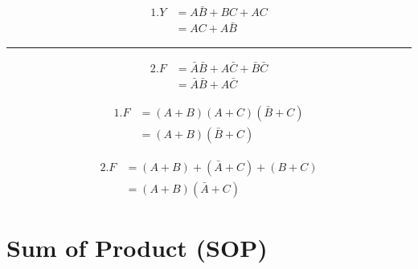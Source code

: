 \documentclass[a4aper,12pt]{report}
\newcounter{examplebox}[chapter]
\begin{document}
\begin{examplebox}[Simplify \\
    \ensuremath{1.Y=A\overline{B}+BC+AC\\2.F=\bar{A}\bar{B}+A\bar{C}+\bar{B}\bar{C}}]
    \begin{minipage}{.45\linewidth}
         \begin{align*}
        1.Y&=A\bar{B}+BC+AC\\
           &=AC+A\bar{B}
    \end{align*}
    \end{minipage}
    \begin{minipage}{0.09\linewidth}
        \rule{1.2pt}{1.7cm}
    \end{minipage}
   \begin{minipage}{.45\linewidth}
        \begin{align*}
            2.F&=\bar{A}\bar{B}+A\bar{C}+\bar{B}\bar{C}\\
               &=\bar{A}\bar{B}+A\bar{C}
        \end{align*}
   \end{minipage}

\end{examplebox}
\vspace{10pt}
\begin{examplebox}[Simplify\\ \ensuremath{1.F=(A+B)(A+C)(\bar{B}+C)\\2.F=(A+B)+(\bar{A}+C)+(B+C)}]
   \begin{minipage}{.5\linewidth}
    \begin{align*}
          1.F&=(A+B)(A+C)(\bar{B}+C)\\
            &=(A+B)(\bar{B}+C)
    \end{align*}
   \end{minipage} 
   \begin{minipage}{.5\linewidth}
    \begin{align*}
        2.F&=(A+B)+(\bar{A}+C)+(B+C)\\
          &=(A+B)(\bar{A}+C)
    \end{align*}
   \end{minipage}
\end{examplebox}


\section{Sum of Product (SOP)}
\end{document}
